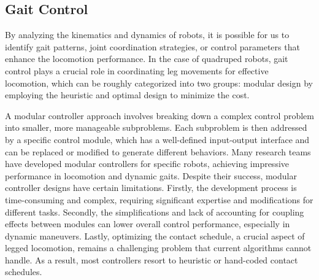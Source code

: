 \subsection{Gait Control}
By analyzing the kinematics and dynamics of robots, it is possible for us to identify gait patterns, joint coordination strategies, or control parameters that enhance the locomotion performance. In the case of quadruped robots, gait control plays a crucial role in coordinating leg movements for effective locomotion, which can be roughly categorized into two groups:  modular design by employing the heuristic and optimal design to minimize the cost. 

A modular controller approach involves breaking down a complex control problem into smaller, more manageable subproblems. Each subproblem is then addressed by a specific control module, which has a well-defined input-output interface and can be replaced or modified to generate different behaviors. Many research teams have developed modular controllers for specific robots\cite{hutterANYmalHighlyMobile2016,bledtMITCheetahDesign2018,jiOmnidirectionalWalkingQuadruped2022}, achieving impressive performance in locomotion and dynamic gaits. Despite their success, modular controller designs have certain limitations. Firstly, the development process is time-consuming and complex, requiring significant expertise and modifications for different tasks. Secondly, the simplifications and lack of accounting for coupling effects between modules can lower overall control performance, especially in dynamic maneuvers. Lastly, optimizing the contact schedule, a crucial aspect of legged locomotion, remains a challenging problem that current algorithms cannot handle\cite{bledtContactModelFusion2018}. As a result, most controllers resort to heuristic or hand-coded contact schedules.

